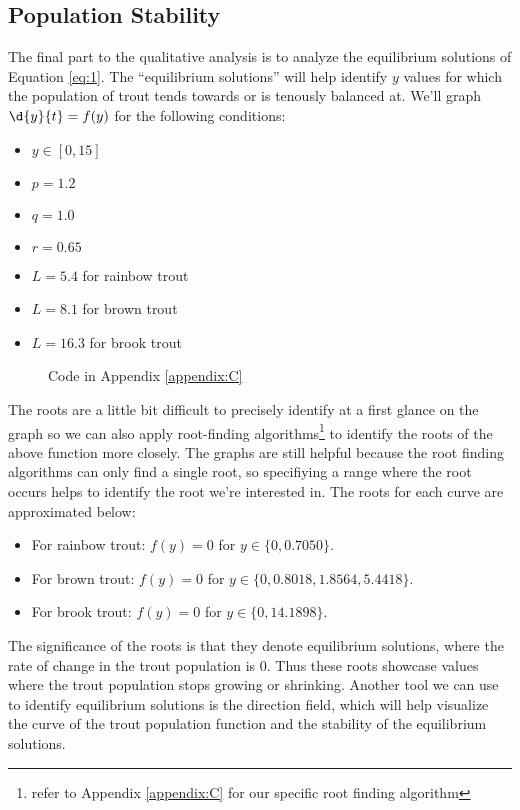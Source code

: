 \documentclass[letterpaper,12pt]{article}
\begin{document}
\subsection{Population Stability}
The final part to the qualitative analysis is to analyze the equilibrium solutions of Equation \eqref{eq:1}. The ``equilibrium solutions'' will help identify \(y\) values for which the population of trout tends towards or is tenously balanced at. We'll graph \(\d{y}{t} = f(y)\) for the following conditions:
\begin{itemize}
    \item \(y \in [0, 15]\)
    \item \(p = 1.2\)
    \item \(q = 1.0\)
    \item \(r = 0.65\)
    \item \(L = 5.4\) for rainbow trout
    \item \(L = 8.1\) for brown trout
    \item \(L = 16.3\) for brook trout
\end{itemize}
\begin{figure}[H]
    \centering
    
    \caption{Code in Appendix \ref{appendix:C}}
    \label{fig:3}
\end{figure}
The roots are a little bit difficult to precisely identify at a first glance on the graph so we can also apply root-finding algorithms\footnote{refer to Appendix \ref{appendix:C} for our specific root finding algorithm} to identify the roots of the above function more closely. 
The graphs are still helpful because the root finding algorithms can only find a single root, so specifiying a range where the root occurs helps to identify the root we're interested in.
The roots for each curve are approximated below:
\begin{itemize}
    \item For rainbow trout: \(f(y) = 0\) for \(y \in \{0, 0.7050\}\).
    \item For brown trout: \(f(y) = 0\) for \(y \in \{0, 0.8018, 1.8564, 5.4418\}\).
    \item For brook trout: \(f(y) = 0\) for \(y \in \{0, 14.1898\}\).
\end{itemize}
The significance of the roots is that they denote equilibrium solutions, where the rate of change in the trout population is 0.
Thus these roots showcase values where the trout population stops growing or shrinking.
Another tool we can use to identify equilibrium solutions is the direction field, which will help visualize the curve of the trout population function and the stability of the equilibrium solutions.
\end{document}

